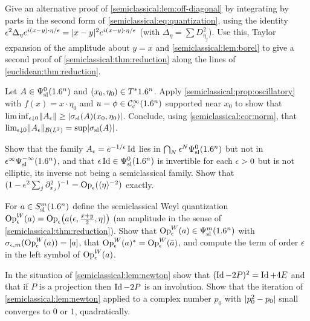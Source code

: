 \begin{exercise}\label{semiclassical:ex:off-diagonal}
  Give an alternative proof of \cref{semiclassical:lem:off-diagonal} by integrating
  by parts in the second form of \eqref{semiclassical:eq:quantization}, using the identity
  $\epsilon^2\Delta_\eta e^{i(x-y)\cdot\eta/\epsilon}=\lvert x-y\rvert^2e^{i(x-y)\cdot\eta/\epsilon}$ (with
  $\Delta_\eta=\sum D_{\eta_j}^2$). Use this, Taylor expansion of the amplitude about
  $y=x$ and \cref{semiclassical:lem:borel} to give a second proof of
  \cref{semiclassical:thm:reduction} along the lines of \cref{euclidean:thm:reduction}.
\end{exercise}

\begin{exercise}\label{semiclassical:ex:norm}
  Let $A\in\Psi^{0}_{\mathrm{sl}}(1.6^n)$ and $(x_0,\eta_0)\in T^*1.6^n$. Apply
  \cref{semiclassical:prop:oscillatory} with $f(x)=x\cdot\eta_0$ and $u=\phi\in\mathcal{C}^\infty_{\mathrm{c}}(1.6^n)$
  supported near $x_0$ to show that
  $\liminf_{\epsilon\downarrow0}\lVert A_\epsilon\rVert\ge\lvert \sigma_{\mathrm{sl}}(A)(x_0,\eta_0)\rvert$. Conclude, using
  \cref{semiclassical:cor:norm}, that
  $\lim_{\epsilon\downarrow0}\lVert A_\epsilon\rVert_{\mathcal{B}(L^2)}=\sup\lvert \sigma_{\mathrm{sl}}(A)\rvert$.
\end{exercise}

\begin{exercise}\label{semiclassical:ex:residual}
  Show that the family $A_\epsilon=e^{-1/\epsilon}\operatorname{Id}$ lies in $\bigcap_N\epsilon^N\Psi^{0}_{\mathrm{sl}}(1.6^n)$ but not in
  $\epsilon^\infty\Psi^{-\infty}_{\mathrm{sl}}(1.6^n)$, and that $\epsilon\operatorname{Id}\in\Psi^{0}_{\mathrm{sl}}(1.6^n)$ is invertible for each
  $\epsilon>0$ but is not elliptic, its inverse not being a semiclassical family. Show that
  $(1-\epsilon^2\sum_j\partial_{x_j}^2)^{-1}=\operatorname{Op}_\epsilon(\langle \eta\rangle^{-2})$ exactly.
\end{exercise}

\begin{exercise}\label{semiclassical:ex:weyl}
  For $a\in S^{m}_{\mathrm{sl}}(1.6^n)$ define the semiclassical Weyl quantization
  $\operatorname{Op}^W_\epsilon(a)=\operatorname{Op}_\epsilon\bigl(a(\epsilon,\tfrac{x+y}2,\eta)\bigr)$ (an amplitude in the sense of
  \cref{semiclassical:thm:reduction}). Show that $\operatorname{Op}^W_\epsilon(a)\in\Psi^{m}_{\mathrm{sl}}(1.6^n)$ with
  $\sigma_{\epsilon,m}(\operatorname{Op}^W_\epsilon(a))=[a]$, that $\operatorname{Op}^W_\epsilon(a)^*=\operatorname{Op}^W_\epsilon(\bar a)$, and compute
  the term of order $\epsilon$ in the left symbol of $\operatorname{Op}^W_\epsilon(a)$.
\end{exercise}

\begin{exercise}\label{semiclassical:ex:projection-identity}
  In the situation of \cref{semiclassical:lem:newton} show that $(\operatorname{Id}-2P)^2=\operatorname{Id}+4E$ and
  that if $P$ is a projection then $\operatorname{Id}-2P$ is an involution. Show that the iteration of
  \cref{semiclassical:lem:newton} applied to a complex number $p_0$ with
  $\lvert p_0^2-p_0\rvert$ small converges to $0$ or $1$, quadratically.
\end{exercise}

